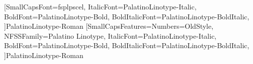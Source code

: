 \setmainfont[SmallCapsFeatures={Numbers=OldStyle},%
  NFSSFamily=Palatino Linotype,%
  ItalicFont=PalatinoLinotype-Italic,%
  BoldFont=PalatinoLinotype-Bold,%
  BoldItalicFont=PalatinoLinotype-BoldItalic,%
]{PalatinoLinotype-Roman}
\newfontfamily{\greekfont}[SmallCapsFont=fsplpscel,
  ItalicFont=PalatinoLinotype-Italic,%
  BoldFont=PalatinoLinotype-Bold,%
  BoldItalicFont=PalatinoLinotype-BoldItalic,%
]{PalatinoLinotype-Roman}
[SmallCapsFeatures={Numbers=OldStyle},%
  NFSSFamily=Palatino Linotype,%
  ItalicFont=PalatinoLinotype-Italic,%
  BoldFont=PalatinoLinotype-Bold,%
  BoldItalicFont=PalatinoLinotype-BoldItalic,%
]{PalatinoLinotype-Roman}




\endinput
